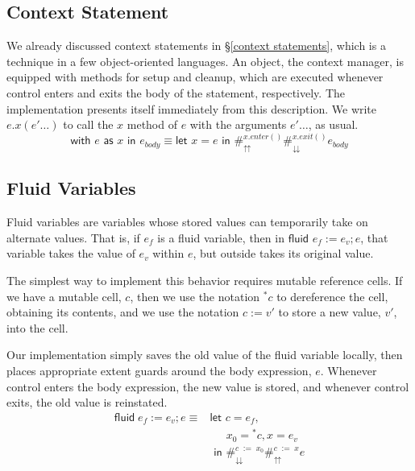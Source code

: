 \documentclass[11pt]{article}
\newcommand{\maybePage}{\null}
\newcommand{\letin}[2]{\textsf{let }#1\textsf{ in }#2}
\begin{document}
\maybePage
\subsection{Context Statement}

We already discussed context statements in \S\ref{context statements}, which is a technique in a few object-oriented languages.
An object, the context manager, is equipped with methods for setup and cleanup, which are executed whenever control enters and exits the body of the statement, respectively.
The implementation presents itself immediately from this description.
We write $e.x(e'\ldots)$ to call the $x$ method of $e$ with the arguments $e'\ldots$, as usual.
$$\textsf{with }e\textsf{ as }x\textsf{ in }e_{body}
\equiv
	\letin{x = e}{\#_\upuparrows^{x.enter()}\#_\downdownarrows^{x.exit()}e_{body}}$$

%

\maybePage
\subsection{Fluid Variables}

Fluid variables are variables whose stored values can temporarily take on alternate values.
That is, if $e_f$ is a fluid variable, then in $\textsf{fluid }e_f := e_v; e$, that variable takes the value of $e_v$ within $e$, but outside takes its original value.

The simplest way to implement this behavior requires mutable reference cells.
If we have a mutable cell, $c$, then we use the notation $^*c$ to dereference the cell, obtaining its contents, and we use the notation $c := v'$ to store a new value, $v'$, into the cell.

Our implementation simply saves the old value of the fluid variable locally, then places appropriate extent guards around the body expression, $e$.
Whenever control enters the body expression, the new value is stored, and whenever control exits, the old value is reinstated.
\begin{align*}
\textsf{fluid}\;e_f:=e_v;e \equiv{}
	&\letin{c = e_f, \\
	&\quad\;\, x_0 = {}^*c, x = e_v \\
	&}{
	\#_\downdownarrows^{c\;:=\;x_0}\#_\upuparrows^{c\;:=\;x}}e
\end{align*}
\end{document}
